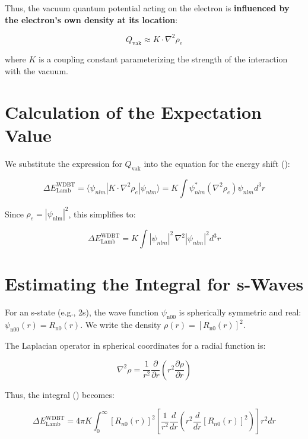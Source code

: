 Thus, the vacuum quantum potential acting on the electron is \textbf{influenced by the electron's own density at its location}:

\begin{equation}
    Q_{\text{vak}} \approx K \cdot \nabla^2 \rho_e
\end{equation}

where $K$ is a coupling constant parameterizing the strength of the interaction with the vacuum.

\section{Calculation of the Expectation Value}
We substitute the expression for $Q_\text{vak}$ into the equation for the energy shift ():

\begin{equation}
    \Delta E_{\text{Lamb}}^{\text{WDBT}} = \langle \psi_{nlm} | K \cdot \nabla^2 \rho_e | \psi_{nlm} \rangle = K \int \psi_{nlm}^* (\nabla^2 \rho_e) \psi_{nlm}  d^3r
\end{equation}

Since $\rho_e = \left| \psi_\text{nlm}\right|^2$, this simplifies to:

\begin{equation}
    \label{eq:wdbt_lamb_shift_integral}
    \Delta E_{\text{Lamb}}^{\text{WDBT}} = K \int |\psi_{nlm}|^2 \, \nabla^2 |\psi_{nlm}|^2  d^3r
\end{equation}

\section{Estimating the Integral for s-Waves}
For an s-state (e.g., 2s), the wave function $\psi_\text{n00}$ is spherically symmetric and real: $\psi_\text{n00}(r) = R_\text{n0}(r)$. We write the density $\rho(r) = [R_\text{n0}(r)]^2$.

The Laplacian operator in spherical coordinates for a radial function is:

\begin{equation}
    \nabla^2 \rho = \frac{1}{r^2} \frac{\partial}{\partial r} \left( r^2 \frac{\partial \rho}{\partial r} \right)
\end{equation}

Thus, the integral () becomes:

\begin{equation}
    \Delta E_{\text{Lamb}}^{\text{WDBT}} = 4\pi K \int_0^\infty [R_{n0}(r)]^2 \left[ \frac{1}{r^2} \frac{d}{dr} \left( r^2 \frac{d}{dr} [R_{n0}(r)]^2 \right) \right] r^2 dr
\end{equation}

